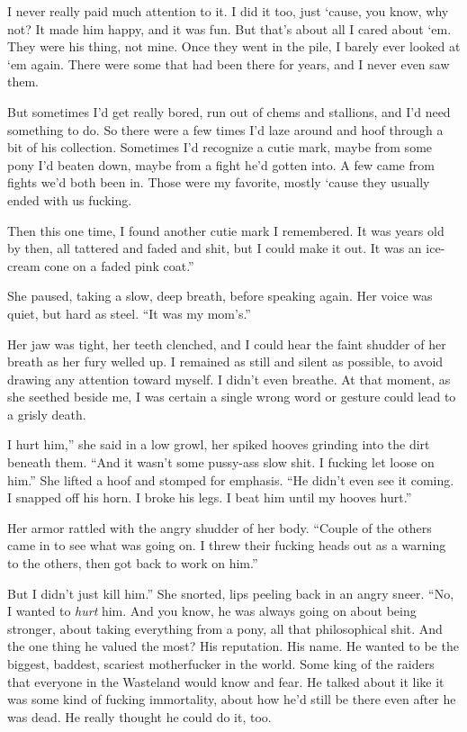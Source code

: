 \leavevmode{}I never really paid much attention to it. I did it too, just ‘cause, you know, why not? It made him happy, and it was fun. But that’s about all I cared about ‘em. They were his thing, not mine. Once they went in the pile, I barely ever looked at ‘em again. There were some that had been there for years, and I never even saw them.

\leavevmode{}But sometimes I’d get really bored, run out of chems and stallions, and I’d need something to do. So there were a few times I’d laze around and hoof through a bit of his collection. Sometimes I’d recognize a cutie mark, maybe from some pony I’d beaten down, maybe from a fight he’d gotten into. A few came from fights we’d both been in. Those were my favorite, mostly ‘cause they usually ended with us fucking.

\leavevmode{}Then this one time, I found another cutie mark I remembered. It was years old by then, all tattered and faded and shit, but I could make it out. It was an ice-cream cone on a faded pink coat.”

She paused, taking a slow, deep breath, before speaking again. Her voice was quiet, but hard as steel. “It was my mom’s.”

Her jaw was tight, her teeth clenched, and I could hear the faint shudder of her breath as her fury welled up. I remained as still and silent as possible, to avoid drawing any attention toward myself. I didn’t even breathe. At that moment, as she seethed beside me, I was certain a single wrong word or gesture could lead to a grisly death.

\leavevmode{}I hurt him,” she said in a low growl, her spiked hooves grinding into the dirt beneath them. “And it wasn’t some pussy-ass slow shit. I fucking let loose on him.” She lifted a hoof and stomped for emphasis. “He didn’t even see it coming. I snapped off his horn. I broke his legs. I beat him until my hooves hurt.”

Her armor rattled with the angry shudder of her body. “Couple of the others came in to see what was going on. I threw their fucking heads out as a warning to the others, then got back to work on him.”

\leavevmode{}But I didn’t just kill him.” She snorted, lips peeling back in an angry sneer. “No, I wanted to \textit{hurt} him. And you know, he was always going on about being stronger, about taking everything from a pony, all that philosophical shit. And the one thing he valued the most? His reputation. His name. He wanted to be the biggest, baddest, scariest motherfucker in the world. Some king of the raiders that everyone in the Wasteland would know and fear. He talked about it like it was some kind of fucking immortality, about how he’d still be there even after he was dead. He really thought he could do it, too.

